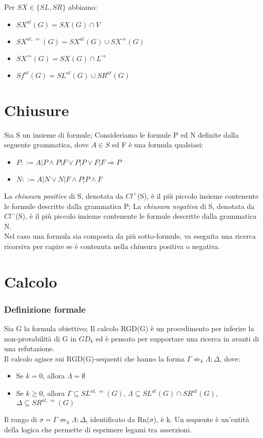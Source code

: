 \documentclass[\main/tesi.tex]{subfiles}
\begin{document}
Per \(SX \in \{SL, SR\}\) abbiamo:
\begin{itemize}
    \item $SX^{at}(G) = SX(G) \cap V$
    \item $SX^{at, \Rightarrow}(G) = SX^{at}(G) \cup SX^{\Rightarrow}(G)$
    \item $SX^{\Rightarrow}(G) = SX(G) \cap L^{\Rightarrow}$
    \item $Sf^{at}(G) = SL^{at}(G) \cup SR^{at}(G)$
\end{itemize}

\newpage

\section{Chiusure}

Sia S un insieme di formule; Consideriamo le formule P ed N definite dalla seguente grammatica, dove \(A \in S\) ed F è una formula qualsiasi:
\begin{itemize}
    \item \(P ::= A|P \land P|F \lor P|P \lor F|F \Rightarrow P\)
    \item \(N ::= A|N \lor N|F \land P|P \land F\)
\end{itemize}
La \textit{chiusura positive} di S, denotata da $Cl^+$(S), è il più piccolo insieme contenente le formule descritte dalla grammatica P;
La \textit{chiusura negativa} di S, denotata da $Cl^-$(S), è il più piccolo insieme contenente le formule descritte dalla grammatica N. \\

Nel caso una formula sia composta da più sotto-formule, va eseguita una ricerca ricorsiva per capire se è contenuta nella chiusura positiva o negativa. \\

\section{Calcolo}

\subsubsection{Definizione formale}
Sia G la formula obiettivo; Il calcolo RGD(G) è un procedimento per inferire la non-provabilità di G in $GD_k$ ed è pensato per supportare una ricerca in avanti di una refutazione.\\
Il calcolo agisce sui RGD(G)-sequenti che hanno la forma $\Gamma \not\Rightarrow_k \Lambda; \Delta$, dove:
\begin{itemize}
    \item Se $k = 0$, allora $\Lambda = \emptyset$
    \item Se $k \geq 0$, allora $\Gamma \subseteq SL^{at,\Rightarrow}(G)$, $\Lambda \subseteq SL^{at}(G) \cap SR^{at}(G)$, $\Delta \subseteq SR^{at,\Rightarrow}(G)$
\end{itemize}
Il rango di $\sigma = \Gamma \not\Rightarrow_k \Lambda; \Delta$, identificato da Rn($\sigma$), è k. Un sequente è un'entità della logica che permette di esprimere legami tra asserzioni.
\end{document}
